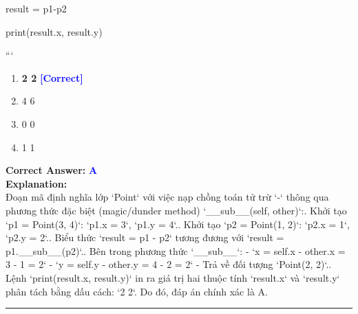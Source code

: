 \documentclass[11pt,a4paper]{article}
\begin{document}
\begin{minipage}{\textwidth}
{\newline
result = p1-p2\newline

\newline
print(result.x, result.y)\newline

\newline
```}

\begin{enumerate}[label=\Alph*.]
    \item \textbf{2 2} \hfill \textcolor{blue}{\textbf{[Correct]}}
    \item 4 6
    \item 0 0
    \item 1 1
\end{enumerate}

\noindent \textbf{Correct Answer:} \textcolor{blue}{\textbf{A}} \\[4pt]
\noindent \textbf{Explanation:}\\
Đoạn mã định nghĩa lớp `Point` với việc nạp chồng toán tử trừ `-` thông qua phương thức đặc biệt (magic/dunder method) `__sub__(self, other)`:. Khởi tạo `p1 = Point(3, 4)`: `p1.x = 3`, `p1.y = 4`.. Khởi tạo `p2 = Point(1, 2)`: `p2.x = 1`, `p2.y = 2`.. Biểu thức `result = p1 - p2` tương đương với `result = p1.__sub__(p2)`.. Bên trong phương thức `__sub__`:\newline
   - `x = self.x - other.x = 3 - 1 = 2`\newline
   - `y = self.y - other.y = 4 - 2 = 2`\newline
   - Trả về đối tượng `Point(2, 2)`.. Lệnh `print(result.x, result.y)` in ra giá trị hai thuộc tính `result.x` và `result.y` phân tách bằng dấu cách: `2 2`.\newline
Do đó, đáp án chính xác là A.
\end{minipage}
\vspace{0.8cm}
\hrule
\vspace{0.5cm}
\end{document}
